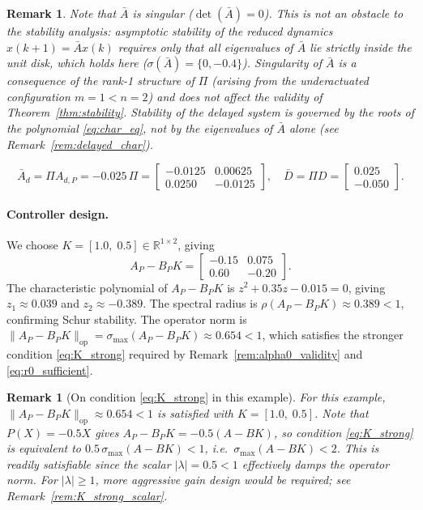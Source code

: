 \documentclass[10pt]{amsart}
\numberwithin{equation}{section}
\newtheorem{remark}[theorem]{Remark}
\begin{document}
\begin{remark}
Note that $\bar{A}$ is singular ($\det(\bar{A})=0$). This is not an obstacle to the
stability analysis: asymptotic stability of the reduced dynamics
$x(k+1) = \bar{A}x(k)$ requires only that all eigenvalues of $\bar{A}$ lie strictly
inside the unit disk, which holds here ($\sigma(\bar{A}) = \{0, -0.4\}$). Singularity
of $\bar{A}$ is a consequence of the rank-1 structure of $\Pi$ (arising from the
underactuated configuration $m=1<n=2$) and does not affect the validity of
Theorem~\ref{thm:stability}. Stability of the \emph{delayed} system is governed by
the roots of the polynomial \eqref{eq:char_eq}, not by the eigenvalues of $\bar{A}$
alone (see Remark~\ref{rem:delayed_char}).
\end{remark}

\[
\bar{A}_d = \Pi A_{d,P} = -0.025\,\Pi =
\begin{bmatrix}-0.0125&0.00625\\0.0250&-0.0125\end{bmatrix}, \quad
\bar{D} = \Pi D = \begin{bmatrix}0.025\\-0.050\end{bmatrix}.
\]

\paragraph{Controller design.}
We choose $K = [1.0,\; 0.5] \in \mathbb{R}^{1\times 2}$, giving
\[
A_P - B_P K =
\begin{bmatrix}-0.15&0.075\\0.60&-0.20\end{bmatrix}.
\]
The characteristic polynomial of $A_P - B_PK$ is $z^2 + 0.35z - 0.015 = 0$, giving
$z_1 \approx 0.039$ and $z_2 \approx -0.389$. The spectral radius is
$\rho(A_P - B_PK) \approx 0.389 < 1$, confirming Schur stability.
The operator norm is $\|A_P - B_PK\|_{\mathrm{op}} = \sigma_{\max}(A_P - B_PK) \approx 0.654 < 1$,
which satisfies the stronger condition \eqref{eq:K_strong} required by
Remark~\ref{rem:alpha0_validity} and \eqref{eq:r0_sufficient}.

\begin{remark}[On condition \eqref{eq:K_strong} in this example]\label{rem:K_strong_example}
For this example, $\|A_P - B_PK\|_{\mathrm{op}} \approx 0.654 < 1$ is satisfied with
$K = [1.0,\;0.5]$. Note that $P(X) = -0.5X$ gives $A_P - B_PK = -0.5(A-BK)$, so
condition \eqref{eq:K_strong} is equivalent to $0.5\,\sigma_{\max}(A-BK) < 1$, i.e.\
$\sigma_{\max}(A-BK) < 2$. This is readily satisfiable since the scalar $|\lambda|=0.5 < 1$
effectively damps the operator norm. For $|\lambda| \geq 1$, more aggressive gain design
would be required; see Remark~\ref{rem:K_strong_scalar}.
\end{remark}
\end{document}

